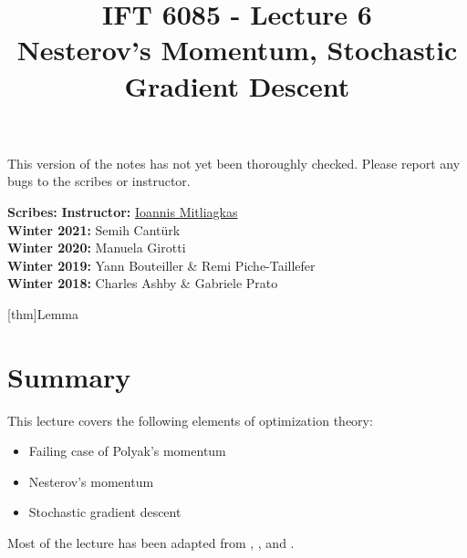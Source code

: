 \documentclass{article}
\title{IFT 6085 - Lecture 6 \\ 
Nesterov's Momentum, Stochastic Gradient Descent }
\date{}
\begin{document}
 

\maketitle


\vspace{-0.5in}
\begin{center}
This version of the notes has not yet been thoroughly checked.
Please report any bugs to the scribes or instructor.
\end{center}
\vspace{0.2in}

\textbf{Scribes:}\hfill
\textbf{Instructor:}  {\href{https://mitliagkas.github.io/}{Ioannis Mitliagkas}}\\
\textbf{Winter 2021:} Semih Cantürk\\
\textbf{Winter 2020:} Manuela Girotti\\
\textbf{Winter 2019:} Yann Bouteiller \& Remi Piche-Taillefer\\
\textbf{Winter 2018:} Charles Ashby \& Gabriele Prato



\newcommand{\infgc}{\inf_{g \in \mathcal{C}}}
\newcommand{\supgc}{\sup_{g \in \mathcal{C}}}

\newcommand{\Prob}{\mathbb{P}}
\newcommand{\E}{\mathbb{E}}
\newcommand{\reals}{\mathbb{R}}

\newtheorem{note}[thm]{Remark}
[thm]{Lemma}

\def\R{\mathbb{R}}
\def\le{\left}
\def\ri{\right}




\section{Summary}

This lecture covers the following elements of optimization theory:

\begin{itemize}
\item Failing case of Polyak's momentum
\item Nesterov's momentum
\item Stochastic gradient descent
\end{itemize}
Most of the lecture has been adapted from \cite{2015arXiv1405.4980v2}, \cite{2014arXiv1408.3595L}, \cite{Nesterov1998} and \cite{Shalev2014}.
\end{document}
